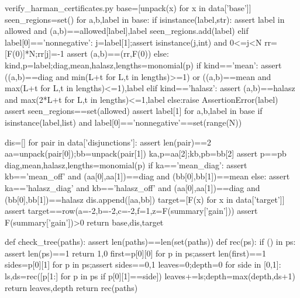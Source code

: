 \begin{filecontents*}[overwrite]{verify_harman_certificates.py}
    base=[unpack(x) for x in data['base']]
    seen_regions=set()
    for a,b,label in base:
        if isinstance(label,str):
            assert label in allowed and (a,b)==allowed[label],label
            seen_regions.add(label)
        elif label[0]=='nonnegative':
            j=label[1];assert isinstance(j,int) and 0<=j<N
            rr=[F(0)]*N;rr[j]=-1
            assert (a,b)==(rr,F(0))
        else:
            kind,p=label;diag,mean,halasz,lengths=monomial(p)
            if kind=='mean':
                assert ((a,b)==diag and min(L+t for L,t in lengths)>=1) or ((a,b)==mean and max(L+t for L,t in lengths)<=1),label
            elif kind=='halasz':
                assert (a,b)==halasz and max(2*L+t for L,t in lengths)<=1,label
            else:raise AssertionError(label)
    assert seen_regions==set(allowed)
    assert {label[1] for a,b,label in base if isinstance(label,list) and label[0]=='nonnegative'}==set(range(N))

    dis=[]
    for pair in data['disjunctions']:
        assert len(pair)==2
        aa=unpack(pair[0]);bb=unpack(pair[1])
        ka,p=aa[2];kb,pb=bb[2]
        assert p==pb
        diag,mean,halasz,lengths=monomial(p)
        if ka=='mean_diag':
            assert kb=='mean_off' and (aa[0],aa[1])==diag and (bb[0],bb[1])==mean
        else:
            assert ka=='halasz_diag' and kb=='halasz_off' and (aa[0],aa[1])==diag and (bb[0],bb[1])==halasz
        dis.append([aa,bb])
    target=[F(x) for x in data['target']]
    assert target==row(a=-2,b=-2,c=-2,f=1,z=F(summary['gain']))
    assert F(summary['gain'])>0
    return base,dis,target

def check_tree(paths):
    assert len(paths)==len(set(paths))
    def rec(ps):
        if () in ps:
            assert len(ps)==1
            return 1,0
        first={p[0][0] for p in ps};assert len(first)==1
        sides={p[0][1] for p in ps};assert sides=={0,1}
        leaves=0;depth=0
        for side in [0,1]:
            ls,ds=rec([p[1:] for p in ps if p[0][1]==side])
            leaves+=ls;depth=max(depth,ds+1)
        return leaves,depth
    return rec(paths)


\end{filecontents*}

